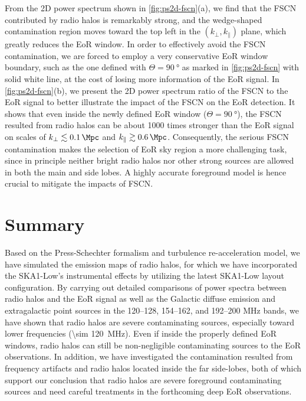\documentclass[twocolumn]{aastex62}
\newcommand{\klos}{\text{$k_{\parallel}$}}
\newcommand{\kperp}{\text{$k_{\bot}$}}
\begin{document}
From the 2D power spectrum shown in \autoref{fig:ps2d-fscn}(a),
we find that the FSCN contributed by radio halos is remarkably strong,
and the wedge-shaped contamination region moves toward the top left in
the $(\kperp, \klos)$ plane, which greatly reduces the EoR window.
In order to effectively avoid the FSCN contamination, we are forced to
employ a very conservative EoR window boundary, such as the one defined
with $\Theta = \SI{90}{\degree}$ as marked in \autoref{fig:ps2d-fscn}
with solid white line, at the cost of losing more information of the EoR
signal.
In \autoref{fig:ps2d-fscn}(b), we present the 2D power spectrum ratio
of the FSCN to the EoR signal to better illustrate the impact of the
FSCN on the EoR detection.
It shows that even inside the newly defined EoR window
($\Theta = \SI{90}{\degree}$), the FSCN resulted from radio halos can
be about 1000 times stronger than the EoR signal on scales of
$\kperp \lesssim \SI{0.1}{\per\Mpc}$ and $\klos \gtrsim \SI{0.6}{\per\Mpc}$.
Consequently,
the serious FSCN contamination makes the selection of EoR sky region
a more challenging task, since in principle neither bright radio halos
nor other strong sources are allowed in both the main and side lobes.
A highly accurate foreground model is hence crucial to mitigate the
impacts of FSCN.


\section{Summary}
\label{sec:summary}

Based on the Press-Schechter formalism and turbulence re-acceleration
model, we have simulated the emission maps of radio halos, for which we
have incorporated the SKA1-Low's instrumental effects by utilizing the
latest SKA1-Low layout configuration.
By carrying out detailed comparisons of power spectra between radio halos
and the EoR signal as well as the Galactic diffuse emission and
extragalactic point sources in the \numrange{120}{128},
\numrange{154}{162}, and \numrange{192}{200} \si{\MHz} bands,
we have shown that radio halos are severe contaminating sources,
especially toward lower frequencies (\SI{\sim 120}{\MHz}).
Even if inside the properly defined EoR windows, radio halos can still
be non-negligible contaminating sources to the EoR observations.
In addition, we have investigated the contamination resulted from
frequency artifacts and radio halos located inside the far side-lobes,
both of which support our conclusion that radio halos are severe
foreground contaminating sources and need careful treatments in the
forthcoming deep EoR observations.
\end{document}
